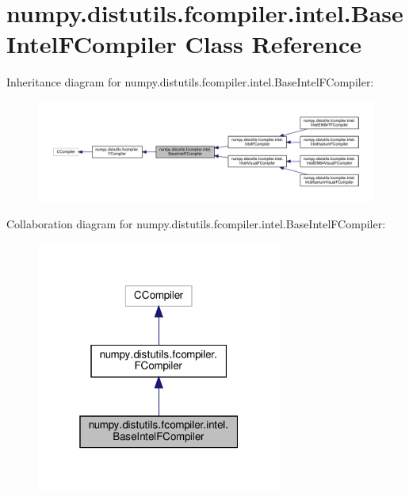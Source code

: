 \hypertarget{classnumpy_1_1distutils_1_1fcompiler_1_1intel_1_1BaseIntelFCompiler}{}\section{numpy.\+distutils.\+fcompiler.\+intel.\+Base\+Intel\+F\+Compiler Class Reference}
\label{classnumpy_1_1distutils_1_1fcompiler_1_1intel_1_1BaseIntelFCompiler}


Inheritance diagram for numpy.\+distutils.\+fcompiler.\+intel.\+Base\+Intel\+F\+Compiler\+:
\nopagebreak
\begin{figure}[H]
\begin{center}
\leavevmode
\includegraphics[width=350pt]{classnumpy_1_1distutils_1_1fcompiler_1_1intel_1_1BaseIntelFCompiler__inherit__graph}
\end{center}
\end{figure}


Collaboration diagram for numpy.\+distutils.\+fcompiler.\+intel.\+Base\+Intel\+F\+Compiler\+:
\nopagebreak
\begin{figure}[H]
\begin{center}
\leavevmode
\includegraphics[width=229pt]{classnumpy_1_1distutils_1_1fcompiler_1_1intel_1_1BaseIntelFCompiler__coll__graph}
\end{center}
\end{figure}
